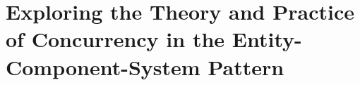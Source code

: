 \chapter{Exploring the Theory and Practice of Concurrency in the Entity-Component-System Pattern}





